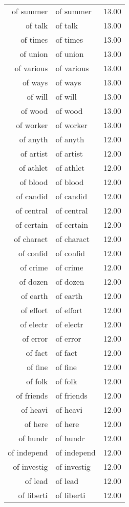 \begin{table}[ht]
\begin{tabular}{rlr}
  of summer & of summer & 13.00 \\ 
  of talk & of talk & 13.00 \\ 
  of times & of times & 13.00 \\ 
  of union & of union & 13.00 \\ 
  of various & of various & 13.00 \\ 
  of ways & of ways & 13.00 \\ 
  of will & of will & 13.00 \\ 
  of wood & of wood & 13.00 \\ 
  of worker & of worker & 13.00 \\ 
  of anyth & of anyth & 12.00 \\ 
  of artist & of artist & 12.00 \\ 
  of athlet & of athlet & 12.00 \\ 
  of blood & of blood & 12.00 \\ 
  of candid & of candid & 12.00 \\ 
  of central & of central & 12.00 \\ 
  of certain & of certain & 12.00 \\ 
  of charact & of charact & 12.00 \\ 
  of confid & of confid & 12.00 \\ 
  of crime & of crime & 12.00 \\ 
  of dozen & of dozen & 12.00 \\ 
  of earth & of earth & 12.00 \\ 
  of effort & of effort & 12.00 \\ 
  of electr & of electr & 12.00 \\ 
  of error & of error & 12.00 \\ 
  of fact & of fact & 12.00 \\ 
  of fine & of fine & 12.00 \\ 
  of folk & of folk & 12.00 \\ 
  of friends & of friends & 12.00 \\ 
  of heavi & of heavi & 12.00 \\ 
  of here & of here & 12.00 \\ 
  of hundr & of hundr & 12.00 \\ 
  of independ & of independ & 12.00 \\ 
  of investig & of investig & 12.00 \\ 
  of lead & of lead & 12.00 \\ 
  of liberti & of liberti & 12.00 \\ 

\end{tabular}
\end{table}
